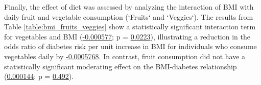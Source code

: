 \documentclass[11pt]{article}
\begin{document}
Finally, the effect of diet was assessed by analyzing the interaction of BMI with daily fruit and vegetable consumption (`Fruits` and `Veggies`). The results from Table \ref{table:bmi_fruits_veggies} show a statistically significant interaction term for vegetables and BMI (\hyperlink{D6a}{-0.000577}; p = \hyperlink{D6d}{0.0223}), illustrating a reduction in the odds ratio of diabetes risk per unit increase in BMI for individuals who consume vegetables daily by \hyperlink{results2}{-0.0005768}. In contrast, fruit consumption did not have a statistically significant moderating effect on the BMI-diabetes relationship (\hyperlink{D4a}{0.000144}; p = \hyperlink{D4d}{0.492}).

\begin{table}[h]
\caption{\protect\hyperlink{file-table-3-pkl}{Analysis of relationship between BMI and Diabetes moderated by Consumption of Fruits and Vegetables}}
\label{table:bmi_fruits_veggies}
\begin{threeparttable}
\renewcommand{\TPTminimum}{\linewidth}
\end{threeparttable}
\end{table}
\end{document}
